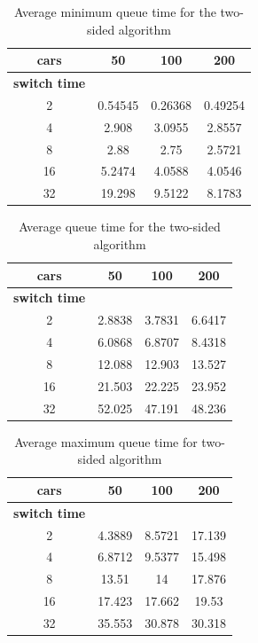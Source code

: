 \documentclass[a4paper,11pt]{article}
\begin{document}
\begin{table}[htb]
\centering
\begin{tabular}{cccc}
\hline
\textbf{cars} & 50 & 100 & 200\\
\hline
\textbf{switch time} & & & \\
2 & 0.54545 & 0.26368 & 0.49254 \\
4 & 2.908 & 3.0955 & 2.8557 \\
8 & 2.88 & 2.75 & 2.5721 \\
16 & 5.2474 & 4.0588 & 4.0546 \\
32 & 19.298 & 9.5122 & 8.1783 \\
\hline
\end{tabular}
\label{tab:twomintime}
\caption{Average minimum queue time for the two-sided algorithm}
\end{table}

\begin{table}[htb]
\centering
\begin{tabular}{cccc}
\hline
\textbf{cars} & 50 & 100 & 200\\
\hline
\textbf{switch time} & & & \\
2 & 2.8838 & 3.7831 & 6.6417 \\
4 & 6.0868 & 6.8707 & 8.4318 \\
8 & 12.088 & 12.903 & 13.527 \\
16 & 21.503 & 22.225 & 23.952 \\
32 & 52.025 & 47.191 & 48.236 \\
\hline
\end{tabular}
\label{tab:twoavgtime}
\caption{Average queue time for the two-sided algorithm}
\end{table}

\begin{table}[htb]
\centering
\begin{tabular}{cccc}
\hline
\textbf{cars} & 50 & 100 & 200\\
\hline
\textbf{switch time} & & & \\
2 & 4.3889 & 8.5721 & 17.139 \\
4 & 6.8712 & 9.5377 & 15.498 \\
8 & 13.51 & 14 & 17.876 \\
16 & 17.423 & 17.662 & 19.53 \\
32 & 35.553 & 30.878 & 30.318 \\
\hline
\end{tabular}
\label{tab:twomaxtime}
\caption{Average maximum queue time for two-sided algorithm}
\end{table}
\end{document}
